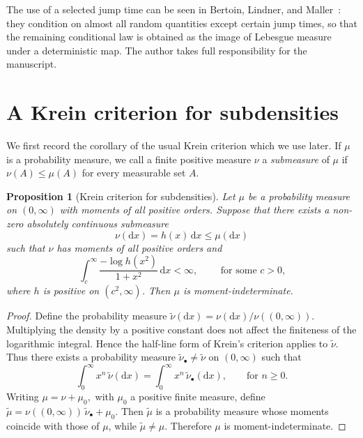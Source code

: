 \documentclass[11pt]{article}
\newtheorem{proposition}[theorem]{Proposition}
\newcommand{\1}{\mathbf 1}
\newcommand{\dd}{\mathrm d}
\begin{document}
The use of a selected jump time can be seen in Bertoin, Lindner, and Maller~\cite[Section 3.3]{Bertoin-Lindner-Maller-2008}: they condition on almost all random quantities except certain jump times, so that the remaining conditional law is obtained as the image of Lebesgue measure under a deterministic map. The author takes full responsibility for the manuscript.

\section{A Krein criterion for subdensities}

    We first record the corollary of the usual Krein criterion which we use later. If $\mu$ is a probability measure, we call a finite positive measure $\nu$  a \textit{submeasure} of $\mu$ if $\nu(A)\leq\mu(A)$ for every measurable set $A$.

\begin{proposition}[Krein criterion for subdensities]\label{prop:subkrein}
Let $\mu$ be a probability measure on $(0,\infty)$ with moments of all positive orders. Suppose that there exists a non-zero absolutely continuous submeasure
\[
 \nu(\dd x)=h(x)\,\dd x\leq \mu(\dd x)
\]
such that $\nu$ has moments of all positive orders and
\begin{equation}\label{eq:krein}
 \int_c^\infty \frac{-\log h(x^2)}{1+x^2}\,\dd x<\infty,
 \qquad
 \text{ for some $c>0$,}
\end{equation}
where $h$ is positive on $(c^2,\infty)$. Then $\mu$ is moment-indeterminate.
\end{proposition}

\begin{proof}
Define the probability measure
$
 \widetilde\nu(\dd x)=\nu(\dd x)/\nu((0,\infty)).
$
Multiplying the density by a positive constant does not affect the finiteness of the logarithmic integral. Hence the half-line form of Krein's criterion \cite[Theorem~4]{Lin-2017} applies to $\widetilde\nu$. Thus there exists a probability measure $\widetilde\nu_\bullet\ne\widetilde\nu$ on $(0,\infty)$ such that
\[
 \int_0^\infty x^n\,\widetilde\nu(\dd x)
 =
 \int_0^\infty x^n\,\widetilde\nu_\bullet(\dd x),
 \qquad
 \text{for }n\geq0.
\]
Writing
$
 \mu=\nu+\mu_0,
$
with $\mu_0$ a positive finite measure, define
$ \widetilde\mu=\nu((0,\infty))\,\widetilde\nu_\bullet+\mu_0.
$
Then $\widetilde\mu$ is a probability measure whose moments coincide with those of $\mu$, while $\widetilde\mu\ne\mu$. Therefore $\mu$ is moment-indeterminate.
\end{proof}
\end{document}
